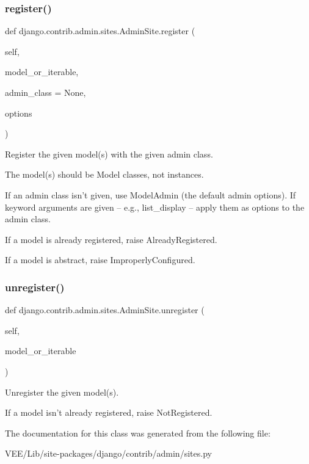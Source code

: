 \subsubsection{\texorpdfstring{register()}{register()}}
{\footnotesize\ttfamily def django.\+contrib.\+admin.\+sites.\+Admin\+Site.\+register (\begin{DoxyParamCaption}\item[{}]{self,  }\item[{}]{model\+\_\+or\+\_\+iterable,  }\item[{}]{admin\+\_\+class = {\ttfamily None},  }\item[{}]{options }\end{DoxyParamCaption})}

\begin{DoxyVerb}Register the given model(s) with the given admin class.

The model(s) should be Model classes, not instances.

If an admin class isn't given, use ModelAdmin (the default admin
options). If keyword arguments are given -- e.g., list_display --
apply them as options to the admin class.

If a model is already registered, raise AlreadyRegistered.

If a model is abstract, raise ImproperlyConfigured.
\end{DoxyVerb}
 \mbox{\label{classdjango_1_1contrib_1_1admin_1_1sites_1_1_admin_site_a865a7f774b0042ee7579112d0e9c51f7}} 
\subsubsection{\texorpdfstring{unregister()}{unregister()}}
{\footnotesize\ttfamily def django.\+contrib.\+admin.\+sites.\+Admin\+Site.\+unregister (\begin{DoxyParamCaption}\item[{}]{self,  }\item[{}]{model\+\_\+or\+\_\+iterable }\end{DoxyParamCaption})}

\begin{DoxyVerb}Unregister the given model(s).

If a model isn't already registered, raise NotRegistered.
\end{DoxyVerb}
 

The documentation for this class was generated from the following file\+:\begin{DoxyCompactItemize}
\item 
V\+E\+E/\+Lib/site-\/packages/django/contrib/admin/sites.\+py\end{DoxyCompactItemize}
